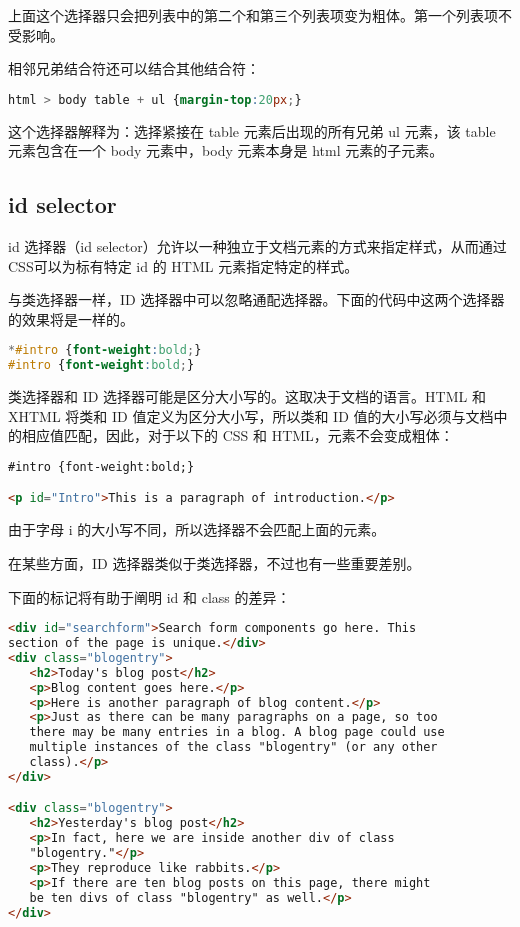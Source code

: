 上面这个选择器只会把列表中的第二个和第三个列表项变为粗体。第一个列表项不受影响。

相邻兄弟结合符还可以结合其他结合符：

\begin{lstlisting}[language=CSS]
html > body table + ul {margin-top:20px;}
\end{lstlisting}

这个选择器解释为：选择紧接在 table 元素后出现的所有兄弟 ul 元素，该 table 元素包含在一个 body 元素中，body 元素本身是 html 元素的子元素。


\subsection{id selector}

id 选择器（id selector）允许以一种独立于文档元素的方式来指定样式，从而通过CSS可以为标有特定 id 的 HTML 元素指定特定的样式。

与类选择器一样，ID 选择器中可以忽略通配选择器。下面的代码中这两个选择器的效果将是一样的。

\begin{lstlisting}[language=CSS]
*#intro {font-weight:bold;}
#intro {font-weight:bold;}
\end{lstlisting}

类选择器和 ID 选择器可能是区分大小写的。这取决于文档的语言。HTML 和 XHTML 将类和 ID 值定义为区分大小写，所以类和 ID 值的大小写必须与文档中的相应值匹配，因此，对于以下的 CSS 和 HTML，元素不会变成粗体：

\begin{lstlisting}[language=HTML]
#intro {font-weight:bold;}

<p id="Intro">This is a paragraph of introduction.</p>
\end{lstlisting}

由于字母 i 的大小写不同，所以选择器不会匹配上面的元素。

在某些方面，ID 选择器类似于类选择器，不过也有一些重要差别。

下面的标记将有助于阐明 id 和 class 的差异：

\begin{lstlisting}[language=HTML]
<div id="searchform">Search form components go here. This
section of the page is unique.</div>
<div class="blogentry">
   <h2>Today's blog post</h2>
   <p>Blog content goes here.</p>
   <p>Here is another paragraph of blog content.</p>
   <p>Just as there can be many paragraphs on a page, so too
   there may be many entries in a blog. A blog page could use
   multiple instances of the class "blogentry" (or any other
   class).</p>
</div>

<div class="blogentry">
   <h2>Yesterday's blog post</h2>
   <p>In fact, here we are inside another div of class
   "blogentry."</p>
   <p>They reproduce like rabbits.</p>
   <p>If there are ten blog posts on this page, there might
   be ten divs of class "blogentry" as well.</p>
</div>
\end{lstlisting}

